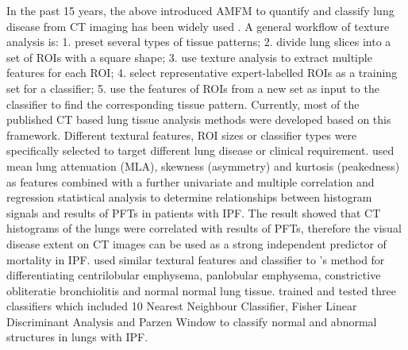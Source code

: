 In the past 15 years, the above introduced AMFM to quantify and classify lung disease from CT imaging has been widely used \citep{van2002automatic,chabat2003obstructive,best2003quantitative,uchiyama2003quantitative,kim2005computer,zavaletta2006high,arzhaeva2007computer,best2008idiopathic,kim2010computer,kim2011quantitative,kim2015comparison}. A general workflow of texture analysis is: 1. preset several types of tissue patterns; 2. divide lung slices into a set of ROIs with a square shape; 3. use texture analysis to extract multiple features for each ROI; 4. select representative expert-labelled ROIs as a training set for a classifier; 5. use the features of ROIs from a new set as input to the classifier to find the corresponding tissue pattern. Currently, most of the published CT based lung tissue analysis methods were developed based on this framework. Different textural features, ROI sizes or classifier types were specifically selected to target different lung disease or clinical requirement. \cite{best2003quantitative,best2008idiopathic} used mean lung attenuation (MLA), skewness (asymmetry) and kurtosis (peakedness) as features combined with a further univariate and multiple correlation and regression statistical analysis to determine relationships between histogram signals and results of PFTs in patients with IPF. The result showed that CT histograms of the lungs were correlated with results of PFTs, therefore the visual disease extent on CT images can be used as a strong independent predictor of mortality in IPF. \cite{chabat2003obstructive} used similar textural features and classifier to \cite{best2003quantitative,best2008idiopathic}'s method for differentiating centrilobular emphysema, panlobular emphysema, constrictive obliteratie bronchiolitis and normal normal lung tissue. \cite{zavaletta2007high} trained and tested three classifiers which included 10 Nearest Neighbour Classifier, Fisher Linear Discriminant Analysis and Parzen Window to classify normal and abnormal structures in lungs with IPF. 

